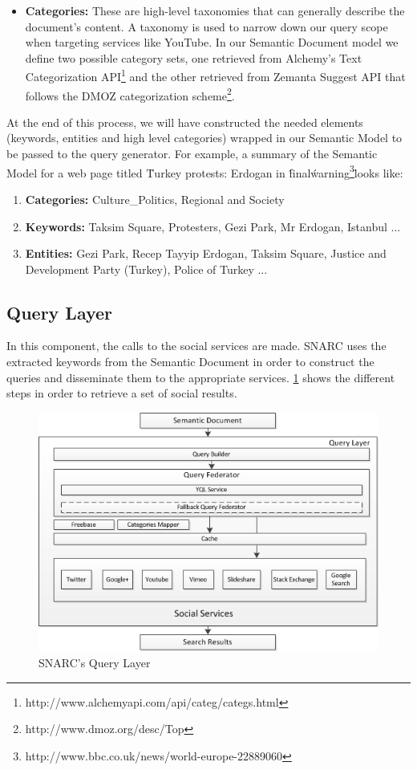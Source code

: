 \documentclass[oribibl]{llncs}
\begin{document}
\begin{enumerate}
\begin{itemize}
\item {\bf Categories:} These are high-level taxonomies that can generally describe the document's content. A taxonomy is used to narrow down our query scope when targeting services like YouTube. In our Semantic Document model we define two possible category sets, one retrieved from Alchemy's Text Categorization API\footnote{http://www.alchemyapi.com/api/categ/categs.html} and the other retrieved from Zemanta Suggest API that follows the DMOZ categorization scheme\footnote{http://www.dmoz.org/desc/Top}.
\end{itemize}
\end{enumerate}
At the end of this process, we will have constructed the needed elements (keywords, entities and high level categories) wrapped in our Semantic Model to be passed to the query generator. For example, a summary of the Semantic Model for a web page titled \"Turkey protests: Erdogan in \'final\' warning\footnote{http://www.bbc.co.uk/news/world-europe-22889060}\"  looks like:
\begin{enumerate}
\item {\bf Categories:} Culture\_Politics, Regional and Society
\item {\bf Keywords:} Taksim Square, Protesters, Gezi Park, Mr Erdogan, Istanbul ...
\item {\bf Entities:} Gezi Park, Recep Tayyip Erdogan, Taksim Square, Justice and Development Party (Turkey), Police of Turkey ...
\end{enumerate}

\subsection{Query Layer}
In this component, the calls to the social services are made. SNARC uses the extracted keywords from the Semantic Document in order to construct the queries and disseminate them to the appropriate services. \ref{fig:2} shows the different steps in order to retrieve a set of social results.
\begin{figure}[h!]
  \centering
    \includegraphics[scale=0.75]{architecture-part2.png}
  \caption{SNARC's Query Layer}
  \label{fig:2}
\end{figure}
\end{document}
